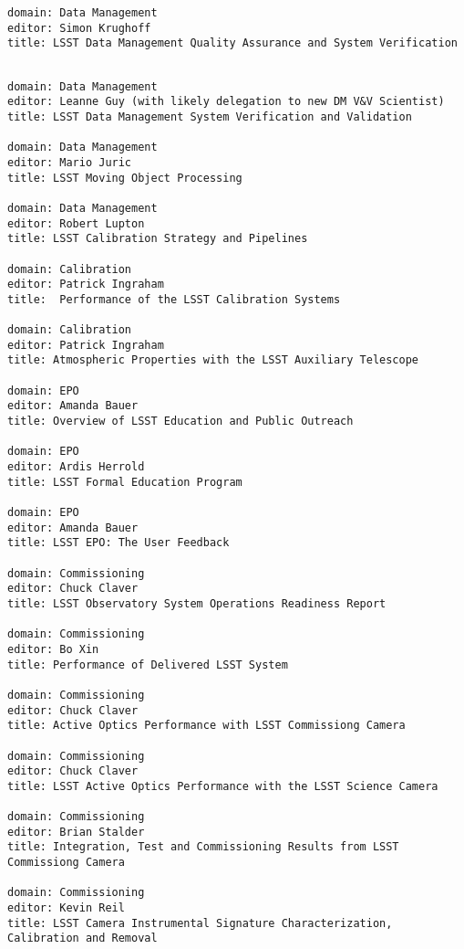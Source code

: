 \begin{verbatim}
domain: Data Management 
editor: Simon Krughoff
title: LSST Data Management Quality Assurance and System Verification


\end{verbatim}
\begin{verbatim}
domain: Data Management 
editor: Leanne Guy (with likely delegation to new DM V&V Scientist)
title: LSST Data Management System Verification and Validation

domain: Data Management 
editor: Mario Juric 
title: LSST Moving Object Processing

domain: Data Management 
editor: Robert Lupton 
title: LSST Calibration Strategy and Pipelines
 
domain: Calibration
editor: Patrick Ingraham 
title:  Performance of the LSST Calibration Systems 

domain: Calibration
editor: Patrick Ingraham 
title: Atmospheric Properties with the LSST Auxiliary Telescope  

domain: EPO 
editor: Amanda Bauer 
title: Overview of LSST Education and Public Outreach

domain: EPO 
editor: Ardis Herrold
title: LSST Formal Education Program

domain: EPO 
editor: Amanda Bauer 
title: LSST EPO: The User Feedback 

domain: Commissioning 
editor: Chuck Claver
title: LSST Observatory System Operations Readiness Report

domain: Commissioning 
editor: Bo Xin 
title: Performance of Delivered LSST System

domain: Commissioning 
editor: Chuck Claver 
title: Active Optics Performance with LSST Commissiong Camera

domain: Commissioning 
editor: Chuck Claver 
title: LSST Active Optics Performance with the LSST Science Camera 

domain: Commissioning 
editor: Brian Stalder 
title: Integration, Test and Commissioning Results from LSST Commissiong Camera

domain: Commissioning 
editor: Kevin Reil
title: LSST Camera Instrumental Signature Characterization, Calibration and Removal


\end{verbatim}
